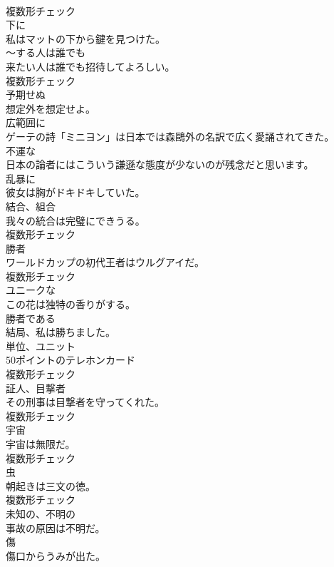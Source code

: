 \documentclass[8pt]{extreport}
\begin{document}
\begin{CJK}{UTF8}{min}
\\	複数形チェック
\\	[副詞]	下に	
\\	私はマットの下から鍵を見つけた。	
\\	[代名詞]	〜する人は誰でも	
\\	来たい人は誰でも招待してよろしい。	
\\	複数形チェック
\\	[形容詞]	予期せぬ	
\\	想定外を想定せよ。	
\\	[副詞]	広範囲に	
\\	ゲーテの詩「ミニヨン」は日本では森鷗外の名訳で広く愛誦されてきた。	
\\	[形容詞]	不運な	
\\	日本の論者にはこういう謙遜な態度が少ないのが残念だと思います。	
\\	[副詞]	乱暴に	
\\	彼女は胸がドキドキしていた。	
\\	[名詞]	結合、組合	
\\	我々の統合は完璧にできうる。	
\\	複数形チェック
\\	[名詞]	勝者	
\\	ワールドカップの初代王者はウルグアイだ。	
\\	複数形チェック
\\	[形容詞]	ユニークな	
\\	この花は独特の香りがする。	
\\	[形容詞]	勝者である	
\\	結局、私は勝ちました。	
\\	[名詞]	単位、ユニット	
\\	50ポイントのテレホンカード	
\\	複数形チェック
\\	[名詞]	証人、目撃者	
\\	その刑事は目撃者を守ってくれた。	
\\	複数形チェック
\\	[名詞]	宇宙	
\\	宇宙は無限だ。	
\\	複数形チェック
\\	[名詞]	虫	
\\	朝起きは三文の徳。	
\\	複数形チェック
\\	[形容詞]	未知の、不明の	
\\	事故の原因は不明だ。	
\\	[名詞]	傷	
\\	傷口からうみが出た。	

\end{CJK}
\end{document}
